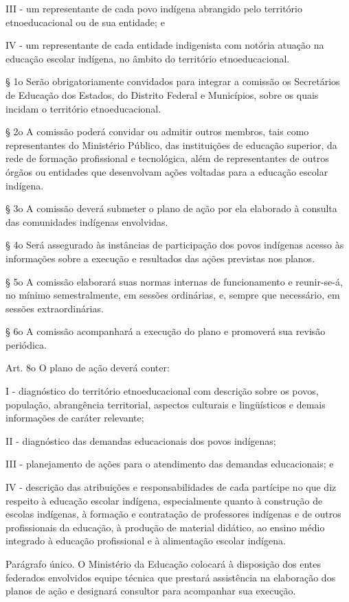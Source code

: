 \documentclass[
]{book}
\begin{document}
III - um representante de cada povo indígena abrangido pelo território etnoeducacional ou de sua entidade; e

IV - um representante de cada entidade indigenista com notória atuação na educação escolar indígena, no âmbito do território etnoeducacional.

§ 1o Serão obrigatoriamente convidados para integrar a comissão os Secretários de Educação dos Estados, do Distrito Federal e Municípios, sobre os quais incidam o território etnoeducacional.

§ 2o A comissão poderá convidar ou admitir outros membros, tais como representantes do Ministério Público, das instituições de educação superior, da rede de formação profissional e tecnológica, além de representantes de outros órgãos ou entidades que desenvolvam ações voltadas para a educação escolar indígena.

§ 3o A comissão deverá submeter o plano de ação por ela elaborado à consulta das comunidades indígenas envolvidas.

§ 4o Será assegurado às instâncias de participação dos povos indígenas acesso às informações sobre a execução e resultados das ações previstas nos planos.

§ 5o A comissão elaborará suas normas internas de funcionamento e reunir-se-á, no mínimo semestralmente, em sessões ordinárias, e, sempre que necessário, em sessões extraordinárias.

§ 6o A comissão acompanhará a execução do plano e promoverá sua revisão periódica.

Art. 8o O plano de ação deverá conter:

I - diagnóstico do território etnoeducacional com descrição sobre os povos, população, abrangência territorial, aspectos culturais e lingüísticos e demais informações de caráter relevante;

II - diagnóstico das demandas educacionais dos povos indígenas;

III - planejamento de ações para o atendimento das demandas educacionais; e

IV - descrição das atribuições e responsabilidades de cada partícipe no que diz respeito à educação escolar indígena, especialmente quanto à construção de escolas indígenas, à formação e contratação de professores indígenas e de outros profissionais da educação, à produção de material didático, ao ensino médio integrado à educação profissional e à alimentação escolar indígena.

Parágrafo único. O Ministério da Educação colocará à disposição dos entes federados envolvidos equipe técnica que prestará assistência na elaboração dos planos de ação e designará consultor para acompanhar sua execução.
\end{document}
